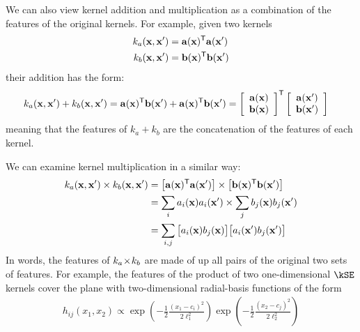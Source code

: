 We can also view kernel addition and multiplication as a combination of the features of the original kernels.
For example, given two kernels
%
\begin{align}
k_a({\bf{x}}, {\bf{x}}') & = {\bf{a}}({\bf{x}})^{\mathsf{T}} {\bf{a}}({\bf{x}}')\\
k_b({\bf{x}}, {\bf{x}}') & = {\bf{b}}({\bf{x}})^{\mathsf{T}} {\bf{b}}({\bf{x}}')
\end{align}
%
their addition has the form:
%
\begin{align}
k_a({\bf{x}}, {\bf{x}}') + k_b({\bf{x}}, {\bf{x}}')
& = {\bf{a}}({\bf{x}})^{\mathsf{T}} {\bf{b}}({\bf{x}}') + {\bf{a}}({\bf{x}})^{\mathsf{T}} {\bf{b}}({\bf{x}}') 
 = \left[ \begin{array}{c} {{\bf{a}}({\bf{x}})} \\ {{\bf{b}}({\bf{x}})} \end{array} \right]^{\mathsf{T}} \left[ \begin{array}{c} {{\bf{a}}({\bf{x}}')} \\ {{\bf{b}}({\bf{x}}')} \end{array} \right]
\end{align}
%
meaning that the features of $k_a + k_b$ are the concatenation of the features of each kernel.

We can examine kernel multiplication in a similar way:
%
\begin{align}
k_a({\bf{x}}, {\bf{x}}') \times k_b({\bf{x}}, {\bf{x}}')
& = \left[ {\bf{a}}({\bf{x}})^{\mathsf{T}} {\bf{a}}({\bf{x}}') \right] \times \left[ {\bf{b}}({\bf{x}})^{\mathsf{T}} {\bf{b}}({\bf{x}}') \right] \\
& = \sum_i a_i({\bf{x}}) a_i({\bf{x}}') \times \sum_j b_j({\bf{x}}) b_j({\bf{x}}') \\
& = \sum_{i,j} \big[ a_i({\bf{x}}) b_j({\bf{x}}) \big] \big[ a_i({\bf{x}}') b_j({\bf{x}}') \big]
\end{align}
%
In words, the features of $k_a \! \times \! k_b$ are made of up all pairs of the original two sets of features.
For example, the features of the product of two one-dimensional $\kSE$ kernels cover the plane with two-dimensional radial-basis functions of the form
%
\begin{align}
h_{ij}(x_1, x_2) \propto \exp \left( -\frac{1}{2} \frac{(x_1 - c_i)^2}{2\ell_1^2} \right) \exp \left( -\frac{1}{2} \frac{(x_2 - c_j)^2}{2\ell_2^2} \right)
\end{align}





